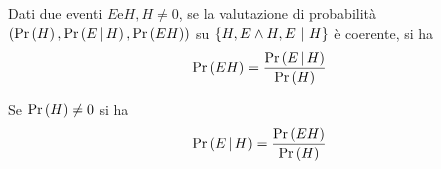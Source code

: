 \documentclass{subfiles}
\begin{document}
\begin{Theorem}
    Dati due eventi \(E \text{e} H, H \neq 0\), se la valutazione di probabilità \((\Prob{H}, \Prob{E}[H], \Prob{EH})\) su \(\Set{H, E \land H, E \Given H}\) è coerente,
    si ha
    \[
        \Prob{EH} = \Frac{\Prob{E}[H]}{\Prob{H}}
    \]
\end{Theorem}\label{thm:3.1}
\begin{Corollary}
    Se \(\Prob{H} \neq 0\) si ha
    \[
        \Prob{E}[H] = \Frac{\Prob{EH}}{\Prob{H}}
    \]
\end{Corollary}
\end{document}
